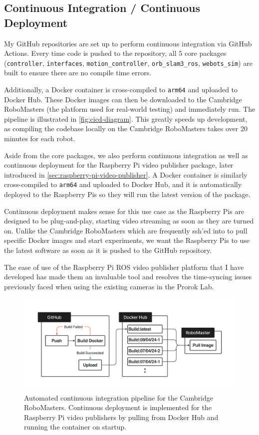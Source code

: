 \subsection{Continuous Integration / Continuous Deployment}
\label{sec:cicd}
My GitHub repositories are set up to perform continuous integration via GitHub Actions. Every time code is pushed to the repository, all 5 core packages (\texttt{controller}, \texttt{interfaces}, \texttt{motion\_controller}, \texttt{orb\_slam3\_ros}, \texttt{webots\_sim}) are built to ensure there are no compile time errors.

Additionally, a Docker container is cross-compiled to \texttt{arm64} and uploaded to Docker Hub. These Docker images can then be downloaded to the Cambridge RoboMasters (the platform used for real-world testing) and immediately run. The pipeline is illustrated in \autoref{fig:cicd-diagram}. This greatly speeds up development, as compiling the codebase locally on the Cambridge RoboMasters takes over 20 minutes for each robot.

Aside from the core packages, we also perform continuous integration as well as continuous deployment for the Raspberry Pi video publisher package, later introduced in \autoref{sec:raspberry-pi-video-publisher}. A Docker container is similarly cross-compiled to \texttt{arm64} and uploaded to Docker Hub, and it is automatically deployed to the Raspberry Pis so they will run the latest version of the package.

Continuous deployment makes sense for this use case as the Raspberry Pis are designed to be plug-and-play, starting video streaming as soon as they are turned on. Unlike the Cambridge RoboMasters which are frequently ssh'ed into to pull specific Docker images and start experiments, we want the Raspberry Pis to use the latest software as soon as it is pushed to the GitHub repository.

The ease of use of the Raspberry Pi ROS video publisher platform that I have developed has made them an invaluable tool and resolves the time-syncing issues previously faced when using the existing cameras in the Prorok Lab.

\begin{figure}[h]
    \centering
    \includegraphics[trim=5cm 5cm 5cm 5cm, scale=0.2]{figures/cicd_diagram.pdf}

    \caption{Automated continuous integration pipeline for the Cambridge RoboMasters. Continuous deployment is implemented for the Raspberry Pi video publishers by pulling from Docker Hub and running the container on startup.}
    \label{fig:cicd-diagram}
\end{figure}


